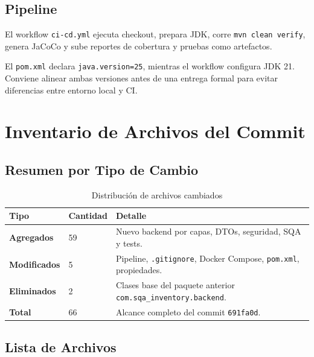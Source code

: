 \documentclass[11pt,oneside]{report}
\begin{document}
\section{Pipeline}

El workflow \texttt{ci-cd.yml} ejecuta checkout, prepara JDK, corre \texttt{mvn clean verify}, genera JaCoCo y sube reportes de cobertura y pruebas como artefactos.

\begin{warningbox}
El \texttt{pom.xml} declara \texttt{java.version=25}, mientras el workflow configura JDK 21. Conviene alinear ambas versiones antes de una entrega formal para evitar diferencias entre entorno local y CI.
\end{warningbox}

\chapter{Inventario de Archivos del Commit}

\section{Resumen por Tipo de Cambio}

\begin{table}[h!]
\centering
\caption{Distribución de archivos cambiados}
\begin{tabularx}{\textwidth}{>{\bfseries}p{3.5cm} p{3cm} X}
\toprule
Tipo & Cantidad & Detalle \\
\midrule
Agregados & 59 & Nuevo backend por capas, DTOs, seguridad, SQA y tests.\\
Modificados & 5 & Pipeline, \texttt{.gitignore}, Docker Compose, \texttt{pom.xml}, propiedades.\\
Eliminados & 2 & Clases base del paquete anterior \texttt{com.sqa\_inventory.backend}.\\
Total & 66 & Alcance completo del commit \texttt{691fa0d}.\\
\bottomrule
\end{tabularx}
\end{table}

\section{Lista de Archivos}
\end{document}
